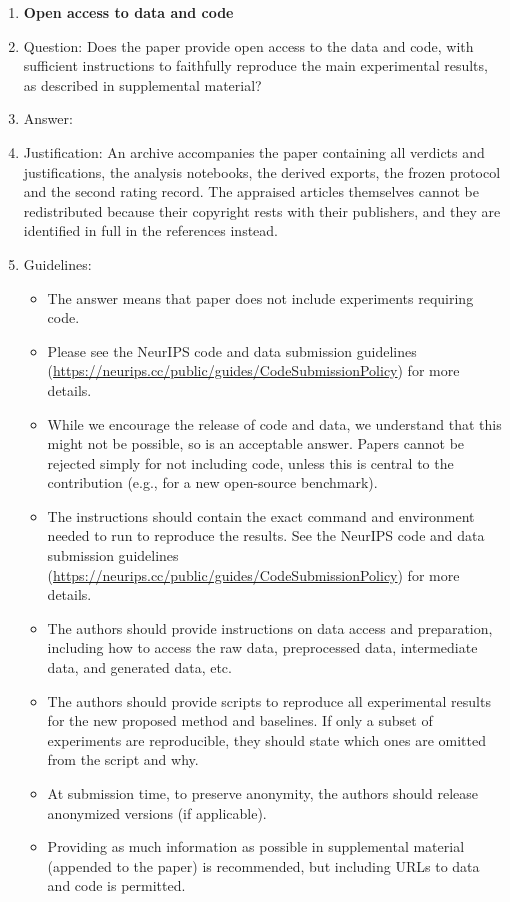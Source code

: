 \documentclass{article}
\begin{document}
\begin{enumerate}
\item {\bf Open access to data and code}
    \item[] Question: Does the paper provide open access to the data and code, with sufficient instructions to faithfully reproduce the main experimental results, as described in supplemental material?
    \item[] Answer: \answerYes{}
    \item[] Justification: An archive accompanies the paper containing all verdicts and justifications, the analysis notebooks, the derived exports, the frozen protocol and the second rating record. The appraised articles themselves cannot be redistributed because their copyright rests with their publishers, and they are identified in full in the references instead.
    \item[] Guidelines:
    \begin{itemize}
        \item The answer \answerNA{} means that paper does not include experiments requiring code.
        \item Please see the NeurIPS code and data submission guidelines (\url{https://neurips.cc/public/guides/CodeSubmissionPolicy}) for more details.
        \item While we encourage the release of code and data, we understand that this might not be possible, so \answerNo{} is an acceptable answer. Papers cannot be rejected simply for not including code, unless this is central to the contribution (e.g., for a new open-source benchmark).
        \item The instructions should contain the exact command and environment needed to run to reproduce the results. See the NeurIPS code and data submission guidelines (\url{https://neurips.cc/public/guides/CodeSubmissionPolicy}) for more details.
        \item The authors should provide instructions on data access and preparation, including how to access the raw data, preprocessed data, intermediate data, and generated data, etc.
        \item The authors should provide scripts to reproduce all experimental results for the new proposed method and baselines. If only a subset of experiments are reproducible, they should state which ones are omitted from the script and why.
        \item At submission time, to preserve anonymity, the authors should release anonymized versions (if applicable).
        \item Providing as much information as possible in supplemental material (appended to the paper) is recommended, but including URLs to data and code is permitted.
    \end{itemize}



\end{enumerate}
\end{document}
